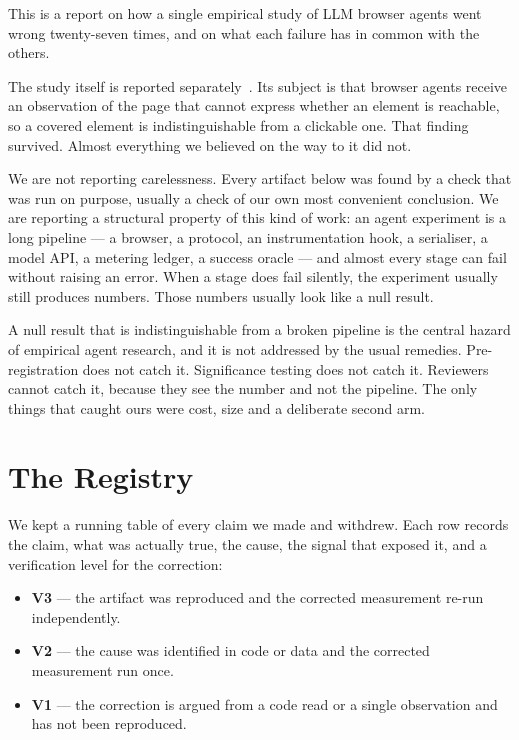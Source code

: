\documentclass[conference]{IEEEtran}
\begin{document}
This is a report on how a single empirical study of LLM browser agents went
wrong twenty-seven times, and on what each failure has in common with the
others.

The study itself is reported separately~\cite{covered}. Its subject is that
browser agents receive an observation of the page that cannot express whether
an element is reachable, so a covered element is indistinguishable from a
clickable one. That finding survived. Almost everything we believed on the way
to it did not.

We are not reporting carelessness. Every artifact below was found by a check
that was run on purpose, usually a check of our own most convenient
conclusion. We are reporting a structural property of this kind of work: an
agent experiment is a long pipeline --- a browser, a protocol, an
instrumentation hook, a serialiser, a model API, a metering ledger, a success
oracle --- and almost every stage can fail without raising an error. When a
stage does fail silently, the experiment usually still produces numbers. Those
numbers usually look like a null result.

A null result that is indistinguishable from a broken pipeline is the central
hazard of empirical agent research, and it is not addressed by the usual
remedies. Pre-registration does not catch it. Significance testing does not
catch it. Reviewers cannot catch it, because they see the number and not the
pipeline. The only things that caught ours were cost, size and a deliberate
second arm.

\section{The Registry}

We kept a running table of every claim we made and withdrew. Each row records
the claim, what was actually true, the cause, the signal that exposed it, and a
verification level for the correction:

\begin{itemize}
\item \textbf{V3} --- the artifact was reproduced and the corrected
measurement re-run independently.
\item \textbf{V2} --- the cause was identified in code or data and the
corrected measurement run once.
\item \textbf{V1} --- the correction is argued from a code read or a single
observation and has not been reproduced.
\end{itemize}
\end{document}
